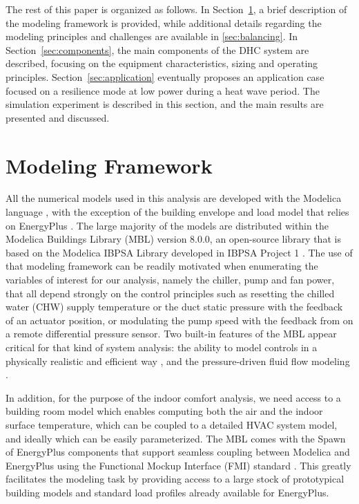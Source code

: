 The rest of this paper is organized as follows.
In Section~\ref{sec:modeling}, a brief description of the modeling framework is provided, while additional details regarding the modeling principles and challenges are available in \ref{sec:balancing}.
In Section~\ref{sec:components}, the main components of the DHC system are described, focusing on the equipment characteristics, sizing and operating principles.
Section~\ref{sec:application} eventually proposes an application case focused on a resilience mode at low power during a heat wave period. The simulation experiment is described in this section, and the main results are presented and discussed.


\section{Modeling Framework} \label{sec:modeling}

All the numerical models used in this analysis are developed with the Modelica language \citep{MattssonElmqvist1997:1}, with the exception of the building envelope and load model that relies on EnergyPlus \citep{Crawley2000}.
The large majority of the models are distributed within the Modelica Buildings Library (MBL) version 8.0.0, an open-source library that is based on the Modelica IBPSA Library \citep{Wetter2015} developed in IBPSA Project 1 \citep{Wetter2019b}.
The use of that modeling framework can be readily motivated when enumerating the variables of interest for our analysis, namely the chiller, pump and fan power, that all depend strongly on the control principles such as resetting the chilled water (CHW) supply temperature or the duct static pressure with the feedback of an actuator position, or modulating the pump speed with the feedback from on a remote differential pressure sensor.
Two built-in features of the MBL appear critical for that kind of system analysis: the ability
to model controls in a physically realistic and efficient way \citep{Wetter2021}, and the pressure-driven fluid flow modeling \citep{Wetter2011b}.

In addition, for the purpose of the indoor comfort analysis, we need access to a building room model which enables computing both the air and the indoor surface temperature, which can be coupled to a detailed HVAC system model, and ideally which can be easily parameterized.
The MBL comes with the Spawn of EnergyPlus components \citep{Wetter2020} that support seamless coupling between Modelica and EnergyPlus using the Functional Mockup Interface (FMI) standard \citep{Blochwitz2011}. This greatly facilitates the modeling task by providing access to a large stock of prototypical building models and standard load profiles already available for EnergyPlus.


